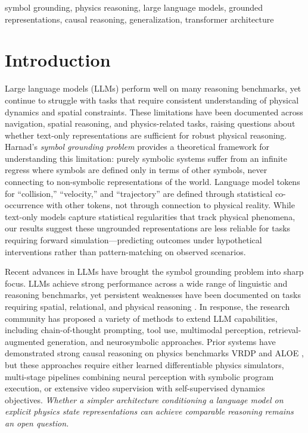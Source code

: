 \documentclass[conference]{IEEEtran}
\theoremstyle{plain}
\theoremstyle{definition}
\theoremstyle{remark}
\begin{document}
\begin{IEEEkeywords}
symbol grounding, physics reasoning, large language models, grounded representations, causal reasoning, generalization, transformer architecture
\end{IEEEkeywords}

\section{Introduction}
\label{sec:intro}
Large language models (LLMs) perform well on many reasoning benchmarks, yet continue to struggle with tasks that require consistent understanding of physical dynamics and spatial constraints. These limitations have been documented across navigation, spatial reasoning, and physics-related tasks, raising questions about whether text-only representations are sufficient for robust physical reasoning. Harnad's \emph{symbol grounding problem} \cite{harnad1990symbol} provides a theoretical framework for understanding this limitation: purely symbolic systems suffer from an infinite regress where symbols are defined only in terms of other symbols, never connecting to non-symbolic representations of the world. Language model tokens for ``collision,'' ``velocity,'' and ``trajectory'' are defined through statistical co-occurrence with other tokens, not through connection to physical reality. While text-only models capture statistical regularities that track physical phenomena, our results suggest these ungrounded representations are less reliable for tasks requiring forward simulation---predicting outcomes under hypothetical interventions rather than pattern-matching on observed scenarios.

Recent advances in LLMs have brought the symbol grounding problem into sharp focus. LLMs achieve strong performance across a wide range of linguistic and reasoning benchmarks, yet persistent weaknesses have been documented on tasks requiring spatial, relational, and physical reasoning \cite{williams2024easy}. In response, the research community has proposed a variety of methods to extend LLM capabilities, including chain-of-thought prompting, tool use, multimodal perception, retrieval-augmented generation, and neurosymbolic approaches. Prior systems have demonstrated strong causal reasoning on physics benchmarks VRDP \cite{ding2021vrdp} and ALOE \cite{ding2021aloe}, but these approaches require either learned differentiable physics simulators, multi-stage pipelines combining neural perception with symbolic program execution, or extensive video supervision with self-supervised dynamics objectives. {\em Whether a simpler architecture conditioning a language model on explicit physics state representations can achieve comparable reasoning remains an open question.}
\end{document}
